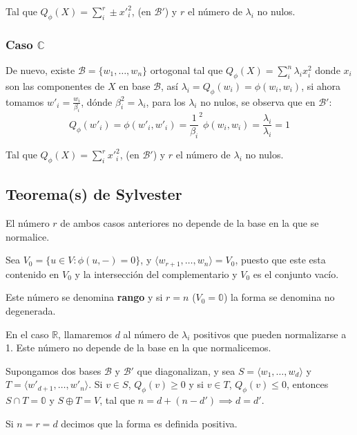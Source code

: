 \documentclass{preset}
\begin{document}
\noindent Tal que $Q_\phi(X) = \sum_i^r \pm {x'}_i^2$, (en $\mathcal{B}'$) y $r$ el número de $\lambda_i$ no nulos.

\clearpage
\vspace{-15pt}
\subsubsection{Caso $\mathbb{C}$}

De nuevo, existe $\mathcal{B}=\{w_1,\dots,w_n\}$ ortogonal tal que $Q_\phi(X) = \sum_i^n \lambda_i x_i^2$ donde $x_i$ son las componentes de $X$ en base $\mathcal{B}$, así $\lambda_i = Q_\phi(w_i)=\phi(w_i,w_i)$, si ahora tomamos $w'_i=\frac{w_i}{\beta_i}$, dónde $\beta_i^2 = \lambda_i$, para los $\lambda_i$ no nulos, se observa que en $\mathcal{B}'$:
\vspace{-10pt}
\[Q_\phi(w'_i)=\phi(w'_i,w'_i)={\frac{1}{\beta_i}}^2 \phi(w_i,w_i) = \frac{\lambda_i}{\lambda_i}=1\]

\noindent Tal que $Q_\phi(X) = \sum_i^r {x'}_i^2$, (en $\mathcal{B}'$) y $r$ el número de $\lambda_i$ no nulos.

\vspace{-15pt}
\subsection{Teorema(s) de Sylvester}

El número $r$ de ambos casos anteriores no depende de la base en la que se normalice.

Sea $V_0 = \{u \in V : \phi(u,-)=0\}$, y $\langle w_{r+1}, \dots, w_n \rangle = V_0$, puesto que este esta contenido en $V_0$ y la intersección del complementario y $V_0$ es el conjunto vacío.

\noindent Este número se denomina \textbf{rango} y si $r=n$ ($V_0 = \mathbb{0}$) la forma se denomina no degenerada.

En el caso $\mathbb{R}$, llamaremos $d$ al número de $\lambda_i$ positivos que pueden normalizarse a 1. Este número no depende de la base en la que normalicemos.

Supongamos dos bases $\mathcal{B}$ y $\mathcal{B}'$ que diagonalizan, y sea $S=\langle w_1, \dots, w_d \rangle$ y $T= \langle w'_{d+1}, \dots, w'_n \rangle$. Si $v \in S$, $Q_\phi(v)\geq 0$ y si $v \in T$, $Q_\phi(v)\leq 0$, entonces $S \cap T = \mathbb{0}$ y $S \oplus T = V$, tal que $n=d+(n-d')\implies d=d'$.

Si $n=r=d$ decimos que la forma es definida positiva.
\end{document}
